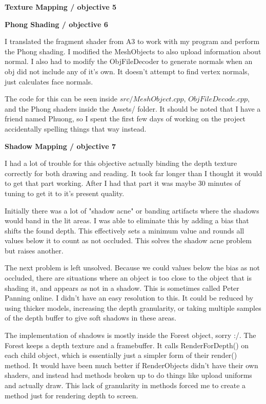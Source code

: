 \documentclass[10pt]{article}
\begin{document}
	\begin{center}
		\bf Texture Mapping / objective 5
	\end{center}
	
	\begin{center}
		\bf Phong Shading / objective 6
	\end{center}
	
	I translated the fragment shader from A3 to work with my program and perform the Phong shading. I modified the MeshObjects to also upload information about normal. I also had to modify the ObjFileDecoder to generate normals when an obj did not include any of it's own. It doesn't attempt to find vertex normals, just calculates face normals.
	
	The code for this can be seen inside $src/MeshObject.cpp$, $ObjFileDecode.cpp$, and the Phong shaders inside the Assets/ folder. It should be noted that I have a friend named Phuong, so I spent the first few days of working on the project accidentally spelling things that way instead.
	
	\begin{center}
		\bf Shadow Mapping / objective 7
	\end{center}
	
	
	
	I had a lot of trouble for this objective actually binding the depth texture correctly for both drawing and reading. It took far longer than I thought it would to get that part working. After I had that part it was maybe 30 minutes of tuning to get it to it's present quality.
	
	Initially there was a lot of "shadow acne" or banding artifacts where the shadows would band in the lit areas. I was able to eliminate this by adding a bias that shifts the found depth. This effectively sets a minimum value and rounds all values below it to count as not occluded. This solves the shadow acne problem but raises another.
	
	The next problem is left unsolved. Because we could values below the bias as not occluded, there are situations where an object is too close to the object that is shading it, and appears as not in a shadow. This is sometimes called Peter Panning online. I didn't have an easy resolution to this. It could be reduced by using thicker models, increasing the depth granularity, or taking multiple samples of the depth buffer to give soft shadows in these areas.

	The implementation of shadows is mostly inside the Forest object, sorry :/. The Forest keeps a depth texture and a framebuffer. It calls RenderForDepth() on each child object, which is essentially just a simpler form of their render() method. It would have been much better if RenderObjects didn't have their own shaders, and instead had methods broken up to do things like upload uniforms and actually draw. This lack of granularity in methods forced me to create a method just for rendering depth to screen.
	
\end{document}
